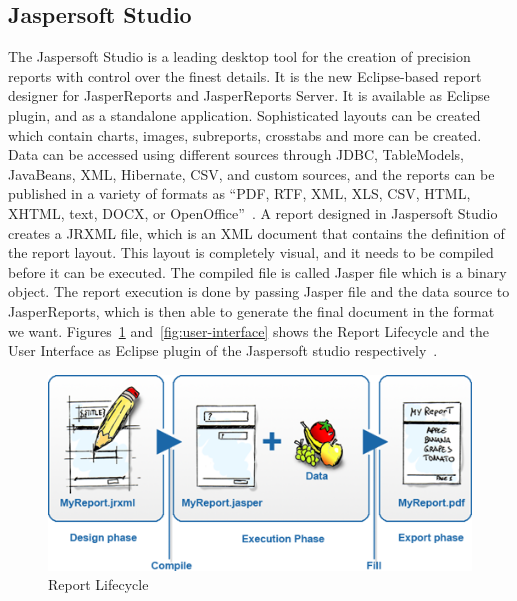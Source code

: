 \subsection{Jaspersoft Studio}
The Jaspersoft Studio is a leading desktop tool for the creation of precision
reports with control over the finest details. It is the new Eclipse-based report
designer for JasperReports and JasperReports Server. It is available as
Eclipse~\cite{hid-sp18-516-www-eclipse} plugin, and as a standalone application.
Sophisticated layouts can be created which contain charts, images, subreports,
crosstabs and more can be created. Data can be accessed using different sources
through JDBC, TableModels, JavaBeans, XML, Hibernate, CSV, and custom sources,
and the reports can be published in a variety of formats as ``PDF, RTF, XML,
XLS, CSV, HTML, XHTML, text, DOCX, or
OpenOffice''~\cite{hid-sp18-516-www-jaspersoft-studio}. A report designed in
Jaspersoft Studio creates a JRXML file, which is an XML document that contains
the definition of the report layout. This layout is completely visual, and it
needs to be compiled before it can be executed. The compiled file is called
Jasper file which is a binary object. The report execution is done by passing
Jasper file and the data source to JasperReports, which is then able to generate
the final document in the format we want. Figures~\ref{fig:report-lifecycle}
and~\ref{fig:user-interface} shows the Report Lifecycle and the User Interface
as Eclipse plugin of the Jaspersoft studio
respectively~\cite{hid-sp18-516-www-jaspersoft-studio}.  

\begin{figure}[!ht]
        \centering\includegraphics[width=\columnwidth]{../images/report-lifecycle.png}
        \caption{Report Lifecycle~\cite{hid-sp18-516-www-jaspersoft-studio}}
        \label{fig:report-lifecycle}
\end{figure}

